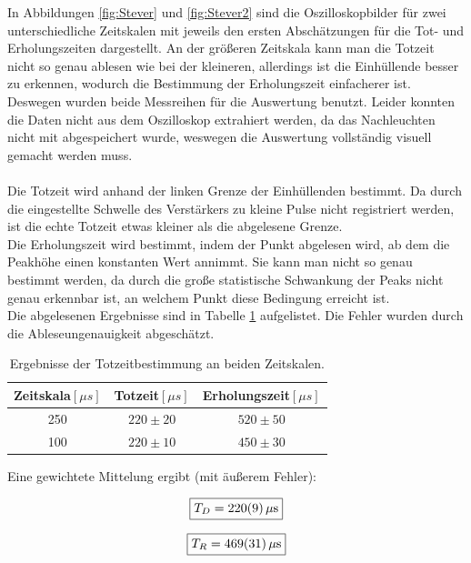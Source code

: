 \documentclass[12pt,a4paper]{article}
\begin{document}
In Abbildungen \ref{fig:Stever} und \ref{fig:Stever2} sind die Oszilloskopbilder für zwei unterschiedliche Zeitskalen mit jeweils den ersten Abschätzungen für die Tot- und Erholungszeiten dargestellt. An der größeren Zeitskala kann man die Totzeit nicht so genau ablesen wie bei der kleineren, allerdings ist die Einhüllende besser zu erkennen, wodurch die Bestimmung der Erholungszeit einfacherer ist. Deswegen wurden beide Messreihen für die Auswertung benutzt.
Leider konnten die Daten nicht aus dem Oszilloskop extrahiert werden, da das Nachleuchten nicht mit abgespeichert wurde, weswegen die Auswertung vollständig visuell gemacht werden muss.\\
\\
Die Totzeit wird anhand der linken Grenze der Einhüllenden bestimmt. Da durch die eingestellte Schwelle des Verstärkers zu kleine Pulse nicht registriert werden, ist die echte Totzeit etwas kleiner als die abgelesene Grenze.\\
Die Erholungszeit wird bestimmt, indem der Punkt abgelesen wird, ab dem die Peakhöhe einen konstanten Wert annimmt.
Sie kann man nicht so genau bestimmt werden, da durch die große statistische Schwankung der Peaks nicht genau erkennbar ist, an welchem Punkt diese Bedingung erreicht ist.\\
Die abgelesenen Ergebnisse sind in Tabelle \ref{teb:Stever} aufgelistet. Die Fehler wurden durch die Ableseungenauigkeit abgeschätzt.

\begin{table}[H]
\centering
\begin{tabular}{|c|c|c|}
\hline
Zeitskala$[\mu s]$ & Totzeit$[\mu s]$ & Erholungszeit$[\mu s]$\\
\hline 
250 & $220\pm 20$ & $520\pm 50$ \\
\hline 
100 & $220\pm 10$ & $450\pm 30$ \\
\hline
\end{tabular}
\caption{Ergebnisse der Totzeitbestimmung an beiden Zeitskalen. }
\label{teb:Stever}
\end{table}

Eine gewichtete Mittelung ergibt (mit äußerem Fehler):

\begin{equation}
\boxed{T_D = \SI{220 \pm 9}{\mu s}}
\end{equation}

\begin{equation}
\boxed{T_R = \SI{469 \pm 31}{\mu s}}
\end{equation}
\end{document}
